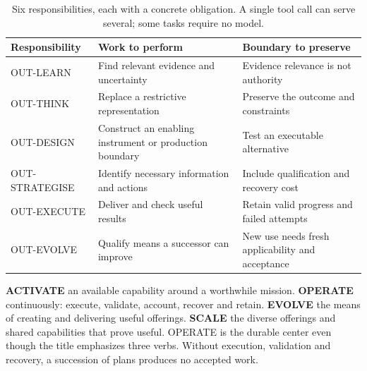 \documentclass[11pt,letterpaper]{article}
\begin{document}
\begin{table}[htbp]\centering\small
\caption{Six responsibilities, each with a concrete obligation. A single tool call can serve several; some tasks require no model.}
\begin{tabularx}{\linewidth}{@{}P{2.65cm}YY@{}}\toprule
Responsibility & Work to perform & Boundary to preserve\\\midrule
OUT-LEARN & Find relevant evidence and uncertainty & Evidence relevance is not authority\\
OUT-THINK & Replace a restrictive representation & Preserve the outcome and constraints\\
OUT-DESIGN & Construct an enabling instrument or production boundary & Test an executable alternative\\
OUT-STRATEGISE & Identify necessary information and actions & Include qualification and recovery cost\\
OUT-EXECUTE & Deliver and check useful results & Retain valid progress and failed attempts\\
OUT-EVOLVE & Qualify means a successor can improve & New use needs fresh applicability and acceptance\\\bottomrule
\end{tabularx}
\end{table}

\textbf{ACTIVATE} an available capability around a worthwhile mission. \textbf{OPERATE} continuously: execute, validate, account, recover and retain. \textbf{EVOLVE} the means of creating and delivering useful offerings. \textbf{SCALE} the diverse offerings and shared capabilities that prove useful. OPERATE is the durable center even though the title emphasizes three verbs. Without execution, validation and recovery, a succession of plans produces no accepted work.
\end{document}

